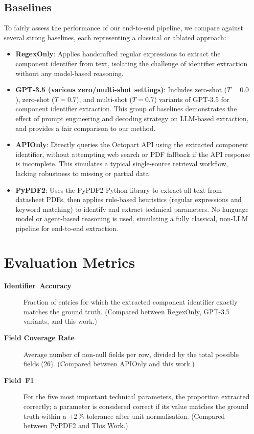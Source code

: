 \subsection{Baselines}
To fairly assess the performance of our end-to-end pipeline, we compare against several strong baselines, each representing a classical or ablated approach:
\begin{itemize}
  \item \textbf{RegexOnly}: Applies handcrafted regular expressions to extract the component identifier from text, isolating the challenge of identifier extraction without any model-based reasoning.
  \item \textbf{GPT-3.5 (various zero/multi-shot settings)}: Includes zero-shot ($T=0.0$), zero-shot ($T=0.7$), and multi-shot ($T=0.7$) variants of GPT-3.5 for component identifier extraction. This group of baselines demonstrates the effect of prompt engineering and decoding strategy on LLM-based extraction, and provides a fair comparison to our method.
  \item \textbf{APIOnly}: Directly queries the Octopart API using the extracted component identifier, without attempting web search or PDF fallback if the API response is incomplete. This simulates a typical single-source retrieval workflow, lacking robustness to missing or partial data.
  \item \textbf{PyPDF2}: Uses the PyPDF2 Python library to extract all text from datasheet PDFs, then applies rule-based heuristics (regular expressions and keyword matching) to identify and extract technical parameters. No language model or agent-based reasoning is used, simulating a fully classical, non-LLM pipeline for end-to-end extraction.
\end{itemize}

\section{Evaluation Metrics}
\begin{description}
  \item[\textbf{Identifier~Accuracy}] Fraction of entries for which the extracted component identifier exactly matches the ground truth. (Compared between RegexOnly, GPT-3.5 variants, and this work.)
  \item[\textbf{Field Coverage Rate}] Average number of non-null fields per row, divided by the total possible fields (26). (Compared between APIOnly and this work.)
  \item[\textbf{Field~F1}] For the five most important technical parameters, the proportion extracted correctly; a parameter is considered correct if its value matches the ground truth within a $\pm2\,\%$ tolerance after unit normalisation. (Compared between PyPDF2 and This Work.)
\end{description}

